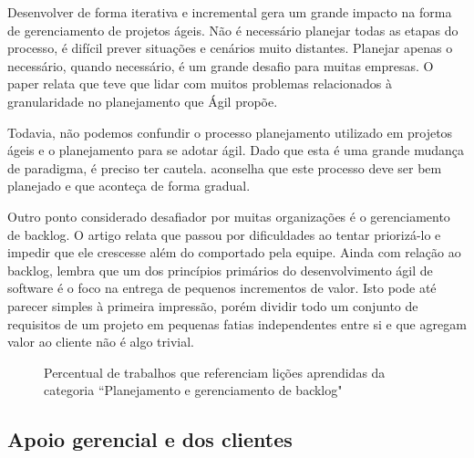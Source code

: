 Desenvolver de forma iterativa e incremental gera um grande impacto na forma de gerenciamento de projetos ágeis. Não é necessário planejar todas as etapas do processo, é difícil prever situações e cenários muito distantes. Planejar apenas o necessário, quando necessário, é um grande desafio para muitas empresas. O paper \cite{Fitzgerald2013} relata que teve que lidar com muitos problemas relacionados à granularidade no planejamento que Ágil propõe.

Todavia, não podemos confundir o processo planejamento utilizado em projetos ágeis e o planejamento para se adotar ágil. Dado que esta é uma grande mudança de paradigma, é preciso ter cautela. \cite{Hajjdiab2011} aconselha que este processo deve ser bem planejado e que aconteça de forma gradual.

Outro ponto considerado desafiador por muitas organizações é o gerenciamento de backlog. O artigo \cite{Block2011} relata que passou por dificuldades ao tentar priorizá-lo e impedir que ele crescesse além do comportado pela equipe. Ainda com relação ao backlog, \cite{Adobe2012} lembra que um dos princípios primários do desenvolvimento ágil de software é o foco na entrega de pequenos incrementos de valor. Isto pode até parecer simples à primeira impressão, porém dividir todo um conjunto de requisitos de um projeto em pequenas fatias independentes entre si e que agregam valor ao cliente não é algo trivial.

\begin{figure}[H]
	\centering
	\captionsetup{justification=centering}
	\caption{Percentual de trabalhos que referenciam lições aprendidas da categoria ``Planejamento e gerenciamento de backlog"}
	\label{fig:backlog}
\end{figure}

\subsection{Apoio gerencial e dos clientes}

